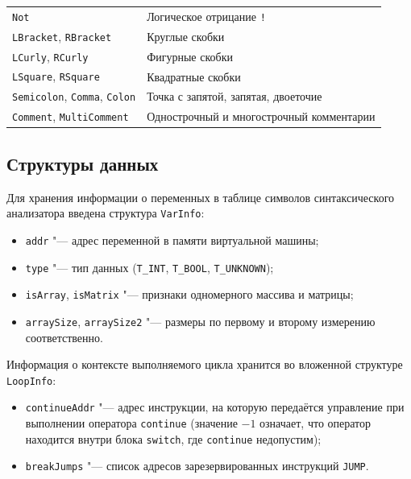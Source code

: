 \documentclass[a4paper,final]{article}
\begin{document}
{\begin{center}
\begin{tabular}{ll}
\texttt{Not} & Логическое отрицание \texttt{!} \\
\texttt{LBracket}, \texttt{RBracket} & Круглые скобки \\
\texttt{LCurly}, \texttt{RCurly} & Фигурные скобки \\
\texttt{LSquare}, \texttt{RSquare} & Квадратные скобки \\
\texttt{Semicolon}, \texttt{Comma}, \texttt{Colon} & Точка с запятой, запятая, двоеточие \\
\texttt{Comment}, \texttt{MultiComment} & Однострочный и многострочный комментарии \\
\hline
\end{tabular}
\end{center}}\small

\subsection{Структуры данных}

Для хранения информации о переменных в таблице символов синтаксического
анализатора введена структура \texttt{VarInfo}:
\begin{itemize}
  \item \texttt{addr} "--- адрес переменной в памяти виртуальной машины;
  \item \texttt{type} "--- тип данных (\texttt{T\_INT}, \texttt{T\_BOOL}, \texttt{T\_UNKNOWN});
  \item \texttt{isArray}, \texttt{isMatrix} "--- признаки одномерного массива и матрицы;
  \item \texttt{arraySize}, \texttt{arraySize2} "--- размеры по первому и второму
        измерению соответственно.
\end{itemize}

Информация о контексте выполняемого цикла хранится во вложенной структуре
\texttt{LoopInfo}:
\begin{itemize}
  \item \texttt{continueAddr} "--- адрес инструкции, на которую передаётся управление
        при выполнении оператора \texttt{continue} (значение $-1$ означает, что оператор
        находится внутри блока \texttt{switch}, где \texttt{continue} недопустим);
  \item \texttt{breakJumps} "--- список адресов зарезервированных инструкций
        \texttt{JUMP}.
\end{itemize}
\end{document}
